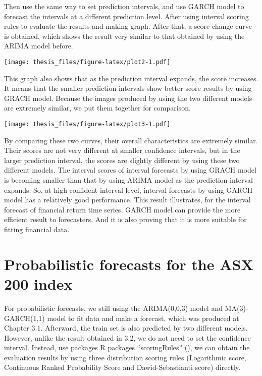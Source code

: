 \documentclass{monashthesis}
\theoremstyle{definition}
\theoremstyle{definition}
\theoremstyle{definition}
\theoremstyle{remark}
\begin{document}
Then use the same way to set prediction intervals, and use GARCH model
to forecast the intervals at a different prediction level. After using
interval scoring rules to evaluate the results and making graph. After
that, a score change curve is obtained, which shows the result very
similar to that obtained by using the ARIMA model before.

\texttt{[image: thesis\_files/figure-latex/plot2-1.pdf]}

This graph also shows that as the prediction interval expands, the score
increases. It means that the smaller prediction intervals show better
score results by using GRACH model. Because the images produced by using
the two different models are extremely similar, we put them together for
comparison.

\texttt{[image: thesis\_files/figure-latex/plot3-1.pdf]}

By comparing these two curves, their overall characteristics are
extremely similar. Their scores are not very different at smaller
confidence intervals, but in the larger prediction interval, the scores
are slightly different by using these two different models. The interval
scores of interval forecasts by using GRACH model is becoming smaller
than that by using ARIMA model as the prediction interval expands. So,
at high confident interval level, interval forecasts by using GARCH
model has a relatively good performance. This result illustrates, for
the interval forecast of financial return time series, GARCH model can
provide the more efficient result to forecasters. And it is also proving
that it is more suitable for fitting financial data.

\section{Probabilistic forecasts for the ASX 200
index}\label{probabilistic-forecasts-for-the-asx-200-index}

For probabilistic forecasts, we still using the ARIMA(0,0,3) model and
MA(3)-GARCH(1,1) model to fit data and make a forecast, which was
produced at Chapter 3.1. Afterward, the train set is also predicted by
two different models. However, unlike the result obtained in 3.2, we do
not need to set the confidence interval. Instead, use packages R
packages ``scoringRules'' (\textcite{JKL17}), we can obtain the
evaluation results by using three distribution scoring rules
(Logarithmic score, Continuous Ranked Probability Score and
Dawid-Sebastianti score) directly.
\end{document}
